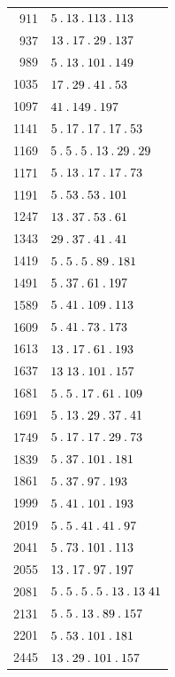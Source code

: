 %
\begingroup\small\setlength{\tabcolsep}{5pt}
\begin{longtable}{@{}r|l@{}}
911 & $5\mathbin{.} 13\mathbin{.} 113\mathbin{.} 113$\\
937 & $13\mathbin{.} 17\mathbin{.} 29\mathbin{.} 137$\\
989 & $5\mathbin{.} 13\mathbin{.} 101\mathbin{.} 149$\\
1035 & $17\mathbin{.} 29\mathbin{.} 41\mathbin{.} 53$\\
1097 & $41\mathbin{.} 149\mathbin{.} 197$\\
1141 & $5\mathbin{.} 17\mathbin{.} 17\mathbin{.} 17\mathbin{.} 53$\\
1169 & $5\mathbin{.} 5\mathbin{.} 5\mathbin{.} 13\mathbin{.} 29\mathbin{.} 29$\\
1171 & $5\mathbin{.} 13\mathbin{.} 17\mathbin{.} 17\mathbin{.} 73$\\
1191 & $5\mathbin{.} 53\mathbin{.} 53\mathbin{.} 101$\\
1247 & $13\mathbin{.} 37\mathbin{.} 53\mathbin{.} 61$\\
1343 & $29\mathbin{.} 37\mathbin{.} 41\mathbin{.} 41$\\
1419 & $5\mathbin{.} 5\mathbin{.} 5\mathbin{.} 89\mathbin{.} 181$\\
1491 & $5\mathbin{.} 37\mathbin{.} 61\mathbin{.} 197$\\
1589 & $5\mathbin{.} 41\mathbin{.} 109\mathbin{.} 113$\\
1609 & $5\mathbin{.} 41\mathbin{.} 73\mathbin{.} 173$\\
1613 & $13\mathbin{.} 17\mathbin{.} 61\mathbin{.} 193$\\
1637 & $13\;13\mathbin{.} 101\mathbin{.} 157$\\
1681 & $5\mathbin{.} 5\mathbin{.} 17\mathbin{.} 61\mathbin{.} 109$\\
1691 & $5\mathbin{.} 13\mathbin{.} 29\mathbin{.} 37\mathbin{.} 41$\\
1749 & $5\mathbin{.} 17\mathbin{.} 17\mathbin{.} 29\mathbin{.} 73$\\
1839 & $5\mathbin{.} 37\mathbin{.} 101\mathbin{.} 181$\\
1861 & $5\mathbin{.} 37\mathbin{.} 97\mathbin{.} 193$\\
1999 & $5\mathbin{.} 41\mathbin{.} 101\mathbin{.} 193$\\
2019 & $5\mathbin{.} 5\mathbin{.} 41\mathbin{.} 41\mathbin{.} 97$\\
2041 & $5\mathbin{.} 73\mathbin{.} 101\mathbin{.} 113$\\
2055 & $13\mathbin{.} 17\mathbin{.} 97\mathbin{.} 197$\\
2081 & $5\mathbin{.} 5\mathbin{.} 5\mathbin{.} 5\mathbin{.} 13\mathbin{.} 13\;41$\\
2131 & $5\mathbin{.} 5\mathbin{.} 13\mathbin{.} 89\mathbin{.} 157$\\
2201 & $5\mathbin{.} 53\mathbin{.} 101\mathbin{.} 181$\\
2445 & $13\mathbin{.} 29\mathbin{.} 101\mathbin{.} 157$\\

\end{longtable}
